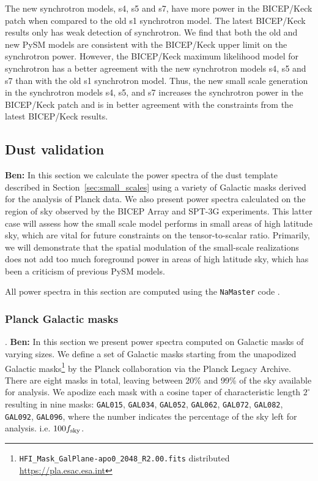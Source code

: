 \documentclass[twocolumn]{aastex631}
\begin{document}
The new synchrotron models, s4, s5 and s7, have more power in the BICEP/Keck patch when compared to the old s1 synchrotron model. The latest BICEP/Keck results only has weak detection of synchrotron. We find that both the old and new PySM models are consistent with the BICEP/Keck upper limit on the synchrotron power. However, the BICEP/Keck maximum likelihood model for synchrotron has a better agreement with the new synchrotron models s4, s5 and s7 than with the old s1 synchrotron model. Thus, the new small scale generation in the synchrotron models s4, s5, and s7 increases the synchrotron power in the BICEP/Keck patch and is in better agreement with the constraints from the latest BICEP/Keck results. 


\subsection{Dust validation} \label{sec:dust_validation}

\textbf{Ben:} In this section we calculate the power spectra of the dust template described in Section~\ref{sec:small_scales} using a variety of Galactic masks derived for the analysis of Planck data. We also present power spectra calculated on the region of sky observed by the BICEP Array and SPT-3G experiments. This latter case will assess how the small scale model performs in small areas of high latitude sky, which are vital for future constraints on the tensor-to-scalar ratio. Primarily, we will demonstrate that the spatial modulation of the small-scale realizations does not add too much foreground power in areas of high latitude sky, which has been a criticism of previous PySM models. 

All power spectra in this section are computed using the {\tt NaMaster} code \citep{Alonso:2019}. 

\subsubsection{Planck Galactic masks} \label{sec:galactic_spectra}

.
\textbf{Ben:} In this section we present power spectra computed on Galactic masks of varying sizes. We define a set of Galactic masks starting from the unapodized Galactic masks\footnote{\texttt{HFI\_Mask\_GalPlane-apo0\_2048\_R2.00.fits} distributed \url{https://pla.esac.esa.int}} by the Planck collaboration via the Planck Legacy Archive. There are eight masks in total, leaving between 20\% and 99\% of the sky available for analysis. We apodize each mask with a cosine taper of characteristic length $2^\circ$ resulting in nine masks: \texttt{GAL015}, \texttt{GAL034}, \texttt{GAL052}, \texttt{GAL062}, \texttt{GAL072}, \texttt{GAL082}, \texttt{GAL092}, \texttt{GAL096}, where the number indicates the percentage of the sky left for analysis. i.e. $100 f_{\rm sky}$.  
\end{document}
